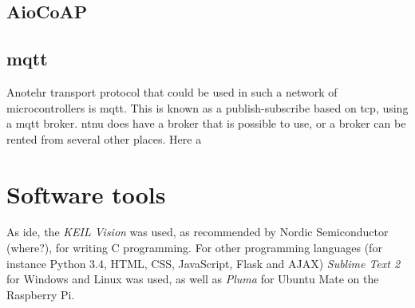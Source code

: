\subsection{AioCoAP}



\subsection{\gls{mqtt}}

Anotehr transport protocol that could be used in such a network of microcontrollers is \gls{mqtt}. This is  known as a publish-subscribe based on \gls{tcp}, using a \gls{mqtt} broker. \gls{ntnu} does have a broker that is possible to use, or a broker can be rented from several other places. Here a 

\cite{hunkeler2008mqtt}

\section{Software tools}

As \gls{ide}, the \textit{KEIL Vision} was used, as recommended by Nordic Semiconductor (where?), for writing C programming. For other programming languages (for instance Python 3.4, HTML, CSS, JavaScript, Flask and AJAX) \textit{Sublime Text 2} for Windows and Linux was used, as well as \textit{Pluma} for Ubuntu Mate on the Raspberry Pi. 






